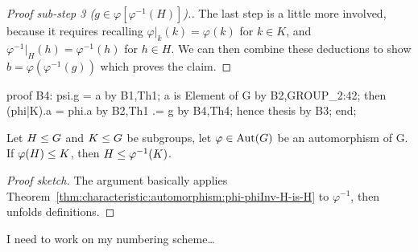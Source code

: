 \begin{proof}[{Proof sub-step 3 ($g\in\varphi[\varphi^{-1}(H)]$)}.]
The last step is a little more involved, because it requires
recalling $\varphi|_{k}(k)=\varphi(k)$ for $k\in K$, and
$\varphi^{-1}|_{H}(h)=\varphi^{-1}(h)$ for $h\in H$. We can then combine
these deductions to show $b=\varphi(\varphi^{-1}(g))$ which proves the claim.
\end{proof}

\nwenddocs{}\endmoddef\nwstartdeflinemarkup{}\nwenddeflinemarkup
proof
  B4: psi.g = a by B1,Th1;
  a is Element of G by B2,GROUP_2:42;
  then (phi|K).a = phi.a by B2,Th1
                .= g by B4,Th4;
  hence thesis by B3;
end;
\nwendcode{}\nwdocspar

\begin{theorem}
Let $H\leq G$ and $K\leq G$ be subgroups, let $\varphi\in\operatorname{Aut}(G)$
be an automorphism of G. If $\varphi(H)\leq K$, then $H\leq\varphi^{-1}(K)$.
\end{theorem}


\begin{proof}[Proof sketch]
The argument basically applies Theorem~\ref{thm:characteristic:automorphism:phi-phiInv-H-is-H} to $\varphi^{-1}$, then unfolds
definitions.
\end{proof}

\begin{thm-remark}
I need to work on my numbering scheme\dots
\end{thm-remark}

